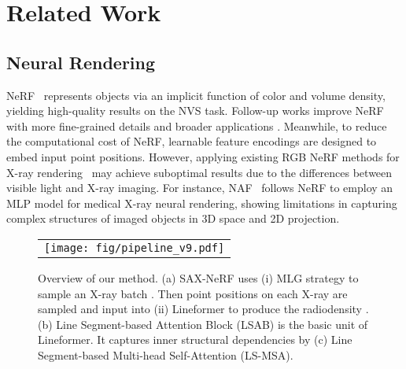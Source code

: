 \documentclass[10pt,twocolumn,letterpaper]{article}
\begin{document}
\vspace{-0.3mm}
\section{Related Work}
\label{sec:rela}
\vspace{-0.2mm}

\subsection{Neural Rendering}
\vspace{-0.2mm}

NeRF~\cite{nerf} represents objects via an implicit function of color and volume density, yielding high-quality results on the NVS task. 
Follow-up works improve NeRF with more fine-grained details \cite{mipnerf21, barron2022mipnerf360} and broader applications  \cite{chen2022hallucinated, xu2022point, wang2022rodin}.
Meanwhile, to reduce the computational cost of NeRF, learnable feature encodings \cite{instant_ngp, tensorf, chen2023neurbf} are designed to embed input point positions.
However, applying existing RGB NeRF methods for X-ray rendering~\cite{naf,mednerf,neat} may achieve suboptimal results due to the differences between visible light and X-ray imaging. For instance, NAF~\cite{naf} follows NeRF to employ an MLP model for medical X-ray neural rendering, showing limitations in capturing complex structures of imaged objects in 3D space and 2D projection.


\begin{figure*}[htp]
	\begin{center}
		\begin{tabular}[t]{c} \hspace{-2.8mm}
			\texttt{[image: fig/pipeline\_v9.pdf]}
		\end{tabular}
	\end{center}
	\vspace*{-6mm}
	\caption{\small Overview of our method. (a) SAX-NeRF uses (i) MLG strategy to sample an X-ray batch . Then  point positions  on each X-ray  are sampled and input into (ii) Lineformer to produce the radiodensity . (b) Line Segment-based Attention Block (LSAB) is the basic unit of Lineformer. It captures inner structural dependencies by (c) Line Segment-based Multi-head Self-Attention (LS-MSA). }
	\label{fig:pipeline}
	\vspace{-2mm}
\end{figure*}
\end{document}
